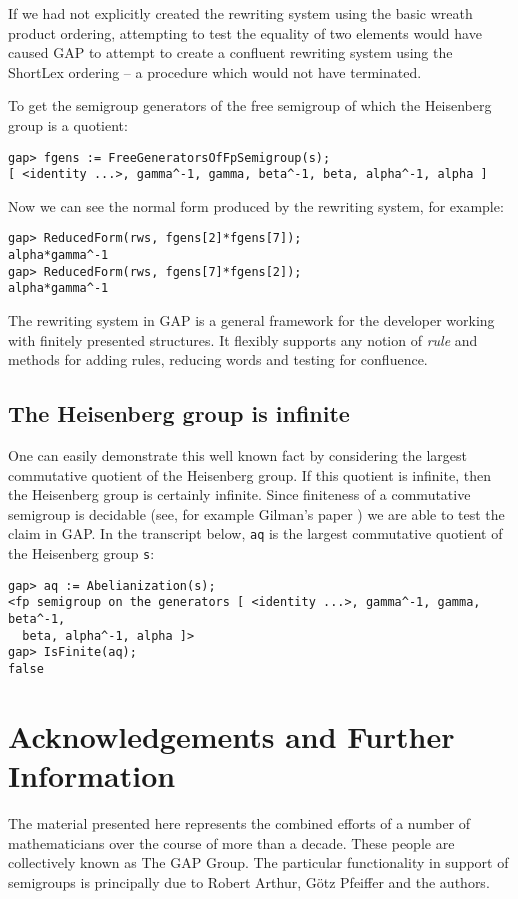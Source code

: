 \documentclass[12pt]{article}
\theoremstyle{plain} \newtheorem{Thm}{Theorem}
\theoremstyle{plain} \newtheorem{Cor}{Corollary}
\theoremstyle{plain} \newtheorem{Lemma}{Lemma}
\theoremstyle{plain} \newtheorem{Prop}{Proposition}
\theoremstyle{plain} \newtheorem{Ex}{Exercise}
\def\gap{\sf GAP}
\begin{document}
If we had not explicitly created the rewriting system using
the basic wreath product ordering, attempting to test the equality of
two elements would have caused {\gap} to attempt to create a confluent 
rewriting system using the ShortLex ordering  -- 
a procedure which would not have terminated.

To get the semigroup generators of the free semigroup of which 
the Heisenberg group is a quotient:
\begin{verbatim}
gap> fgens := FreeGeneratorsOfFpSemigroup(s);
[ <identity ...>, gamma^-1, gamma, beta^-1, beta, alpha^-1, alpha ]
\end{verbatim}
Now we can see the normal form produced by the rewriting system, for example:
\begin{verbatim}
gap> ReducedForm(rws, fgens[2]*fgens[7]);
alpha*gamma^-1
gap> ReducedForm(rws, fgens[7]*fgens[2]);
alpha*gamma^-1
\end{verbatim}

The rewriting system in {\gap} is a  general framework for the developer 
working with finitely presented structures.
It flexibly supports any  notion of 
{\em rule} and methods for
adding rules, reducing words and testing for confluence. 

\subsection{The Heisenberg group is infinite}
One can easily demonstrate this well known fact by considering the 
largest commutative quotient of the Heisenberg group. If this quotient
is infinite, then the Heisenberg group is certainly infinite. 
Since finiteness of a commutative semigroup is decidable (see, for example
Gilman's paper \cite{rhg79}) we are able to test the claim in {\gap}.
In the transcript below, {\tt aq} is the largest commutative 
quotient of the Heisenberg group {\tt s}:
\begin{verbatim}
gap> aq := Abelianization(s);
<fp semigroup on the generators [ <identity ...>, gamma^-1, gamma, beta^-1, 
  beta, alpha^-1, alpha ]>
gap> IsFinite(aq);
false
\end{verbatim}


\section*{Acknowledgements and Further Information}
The material presented here represents the combined efforts of
a number of mathematicians over the course of more than a decade. These
people are collectively known as The {\gap} Group. 
The particular functionality  in support of semigroups is principally due to 
Robert Arthur, G\"{o}tz Pfeiffer and the authors.
\end{document}
